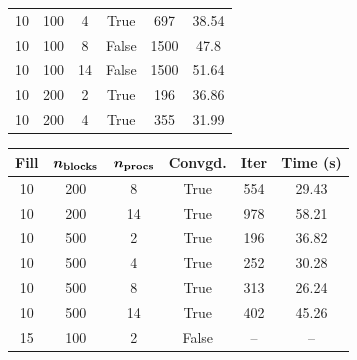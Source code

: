 \begin{table}[H]
\begin{minipage}{0.48\textwidth}
\begin{tabular}{cccccc}
		10            & 100                             & 4                              & True             & 697           & 38.54             \\
		10            & 100                             & 8                              & False            & 1500          & 47.8              \\
		10            & 100                             & 14                             & False            & 1500          & 51.64             \\
		10            & 200                             & 2                              & True             & 196           & 36.86             \\
		10            & 200                             & 4                              & True             & 355           & 31.99             \\
		\bottomrule
	\end{tabular}
  \end{minipage}
  \begin{minipage}{0.48\textwidth}
	\centering
	\begin{tabular}{cccccc}
		\toprule
		\textbf{Fill} & \textbf{$\bm {n_{\rm blocks}}$} & \textbf{$\bm{n_{\rm procs}}$} & \textbf{Convgd.} & \textbf{Iter} & \textbf{Time (s)} \\
		\midrule
		10            & 200                             & 8                        & True             & 554           & 29.43             \\
		10            & 200                             & 14                       & True             & 978           & 58.21             \\
		10            & 500                             & 2                        & True             & 196           & 36.82             \\
		10            & 500                             & 4                        & True             & 252           & 30.28             \\
		10            & 500                             & 8                        & True             & 313           & 26.24             \\
		10            & 500                             & 14                       & True             & 402           & 45.26             \\
		\midrule
		15            & 100                             & 2                        & False            & --            & --                \\

\end{tabular}
\end{minipage}
\end{table}
